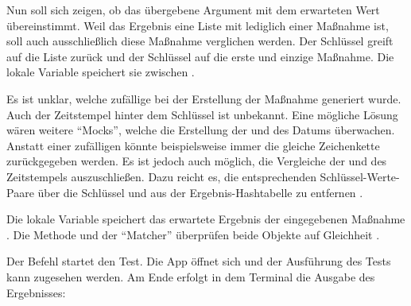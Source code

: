 Nun soll sich zeigen, ob das übergebene Argument mit dem erwarteten Wert übereinstimmt.
Weil das Ergebnis eine Liste mit lediglich einer Maßnahme ist, soll auch ausschließlich diese Maßnahme verglichen werden.
Der Schlüssel  greift auf die Liste zurück und der Schlüssel  auf die erste und einzige Maßnahme.
Die lokale Variable  speichert sie zwischen .

Es ist unklar, welche zufällige  bei der Erstellung der Maßnahme generiert wurde.
Auch der Zeitstempel hinter dem Schlüssel  ist unbekannt.
Eine mögliche Lösung wären weitere \enquote{Mocks}, welche die Erstellung der  und des Datums überwachen. Anstatt einer zufälligen  könnte beispielsweise immer die gleiche Zeichenkette zurückgegeben werden.
Es ist jedoch auch möglich, die Vergleiche der  und des Zeitstempels auszuschließen.
Dazu reicht es, die entsprechenden Schlüssel-Werte-Paare über die Schlüssel  und  aus der Ergebnis-Hashtabelle zu entfernen .

Die lokale Variable  speichert das erwartete Ergebnis der eingegebenen Maßnahme .
Die Methode  und der \enquote{Matcher}  überprüfen beide Objekte auf Gleichheit .

Der Befehl  startet den Test. Die App öffnet sich und der Ausführung des Tests kann zugesehen werden. Am Ende erfolgt in dem Terminal die Ausgabe des Ergebnisses: 

